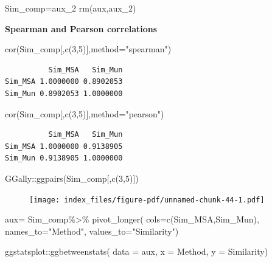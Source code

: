 \documentclass[
  letterpaper,
  DIV=11,
  numbers=noendperiod]{scrreprt}
\newenvironment{Shaded}{}{}
\newcommand{\AttributeTok}[1]{\textcolor[rgb]{0.78,0.47,0.87}{#1}}
\newcommand{\DecValTok}[1]{\textcolor[rgb]{0.82,0.60,0.40}{#1}}
\newcommand{\FunctionTok}[1]{\textcolor[rgb]{0.38,0.69,0.94}{#1}}
\newcommand{\NormalTok}[1]{\textcolor[rgb]{0.67,0.70,0.75}{#1}}
\newcommand{\OtherTok}[1]{\textcolor[rgb]{0.15,0.68,0.38}{#1}}
\newcommand{\SpecialCharTok}[1]{\textcolor[rgb]{0.34,0.71,0.76}{#1}}
\newcommand{\StringTok}[1]{\textcolor[rgb]{0.60,0.76,0.47}{#1}}
\begin{document}
\begin{Shaded}
\begin{Highlighting}[]
\NormalTok{Sim\_comp}\OtherTok{=}\NormalTok{aux\_2}
\FunctionTok{rm}\NormalTok{(aux,aux\_2)}
\end{Highlighting}
\end{Shaded}

\textbf{Spearman and Pearson correlations}

\begin{Shaded}
\begin{Highlighting}[]
\FunctionTok{cor}\NormalTok{(Sim\_comp[,}\FunctionTok{c}\NormalTok{(}\DecValTok{3}\NormalTok{,}\DecValTok{5}\NormalTok{)],}\AttributeTok{method=}\StringTok{"spearman"}\NormalTok{)}
\end{Highlighting}
\end{Shaded}

\begin{verbatim}
          Sim_MSA   Sim_Mun
Sim_MSA 1.0000000 0.8902053
Sim_Mun 0.8902053 1.0000000
\end{verbatim}

\begin{Shaded}
\begin{Highlighting}[]
\FunctionTok{cor}\NormalTok{(Sim\_comp[,}\FunctionTok{c}\NormalTok{(}\DecValTok{3}\NormalTok{,}\DecValTok{5}\NormalTok{)],}\AttributeTok{method=}\StringTok{"pearson"}\NormalTok{)}
\end{Highlighting}
\end{Shaded}

\begin{verbatim}
          Sim_MSA   Sim_Mun
Sim_MSA 1.0000000 0.9138905
Sim_Mun 0.9138905 1.0000000
\end{verbatim}

\begin{Shaded}
\begin{Highlighting}[]
\NormalTok{GGally}\SpecialCharTok{::}\FunctionTok{ggpairs}\NormalTok{(Sim\_comp[,}\FunctionTok{c}\NormalTok{(}\DecValTok{3}\NormalTok{,}\DecValTok{5}\NormalTok{)])}
\end{Highlighting}
\end{Shaded}

\begin{figure}[H]

{\centering \texttt{[image: index\_files/figure-pdf/unnamed-chunk-44-1.pdf]}

}

\end{figure}

\begin{Shaded}
\begin{Highlighting}[]
\NormalTok{aux}\OtherTok{=}\NormalTok{ Sim\_comp}\SpecialCharTok{\%\textgreater{}\%} \FunctionTok{pivot\_longer}\NormalTok{(}
  \AttributeTok{cols=}\FunctionTok{c}\NormalTok{(Sim\_MSA,Sim\_Mun),}
  \AttributeTok{names\_to=}\StringTok{"Method"}\NormalTok{,}
  \AttributeTok{values\_to=}\StringTok{"Similarity"}\NormalTok{)}

\NormalTok{ggstatsplot}\SpecialCharTok{::}\FunctionTok{ggbetweenstats}\NormalTok{(}
  \AttributeTok{data =}\NormalTok{ aux,}
  \AttributeTok{x =}\NormalTok{ Method,}
  \AttributeTok{y =}\NormalTok{ Similarity)}
\end{Highlighting}
\end{Shaded}
\end{document}
